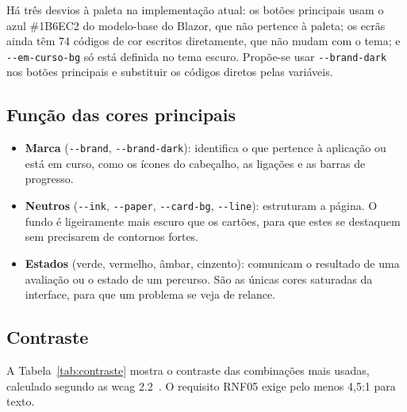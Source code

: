 Há três desvios à paleta na implementação atual: os botões principais usam o azul \#1B6EC2 do modelo-base do Blazor, que não pertence à paleta; os ecrãs ainda têm 74 códigos de cor escritos diretamente, que não mudam com o tema; e \texttt{-{}-em-curso-bg} só está definida no tema escuro. Propõe-se usar \texttt{-{}-brand-dark} nos botões principais e substituir os códigos diretos pelas variáveis.

\subsection{Função das cores principais}

\begin{itemize}
    \item \textbf{Marca} (\texttt{-{}-brand}, \texttt{-{}-brand-dark}): identifica o que pertence à aplicação ou está em curso, como os ícones do cabeçalho, as ligações e as barras de progresso.
    \item \textbf{Neutros} (\texttt{-{}-ink}, \texttt{-{}-paper}, \texttt{-{}-card-bg}, \texttt{-{}-line}): estruturam a página. O fundo é ligeiramente mais escuro que os cartões, para que estes se destaquem sem precisarem de contornos fortes.
    \item \textbf{Estados} (verde, vermelho, âmbar, cinzento): comunicam o resultado de uma avaliação ou o estado de um percurso. São as únicas cores saturadas da interface, para que um problema se veja de relance.
\end{itemize}

\subsection{Contraste}

A Tabela~\ref{tab:contraste} mostra o contraste das combinações mais usadas, calculado segundo as \gls{wcag} 2.2~\citep{w3c-wcag22}. O requisito RNF05 exige pelo menos 4,5:1 para texto.

